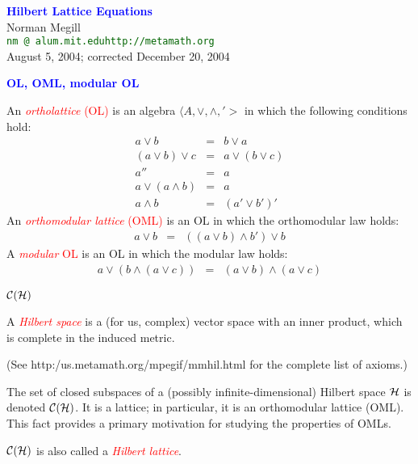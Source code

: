 \documentclass{slides}
\begin{document}
\raggedright
\pagecolor{mint}


\begin{slide}
\begin{center}
\textcolor{blue}{\textbf{\LARGE Hilbert Lattice
Equations}}\\
\vspace{3ex}
{\large Norman Megill}\\
\vspace{1ex}
\textcolor{darkgreen}{\texttt{nm {}@ alum.mit.edu\qquad http://metamath.org}}\\
\vspace{1ex}
August 5, 2004; corrected December 20, 2004
\end{center}
\end{slide}

\begin{slide}

\begin{center}
\textcolor{blue}{\textbf{OL, OML, modular OL}}
\end{center}

An \textcolor{red}{\textit{ortholattice} (OL)} is an algebra
$\langle A,\vee,\wedge,'>$ in which the following conditions hold:
\begin{eqnarray}
a\vee b & = & b\vee a\\
(a\vee b)\vee c & = & a\vee (b\vee c)\\
a'' & = & a\\
a\vee (a\wedge b) & = & a\\
a\wedge b & = & (a'\vee b')'
\end{eqnarray}
An \textcolor{red}{\textit{orthomodular lattice} (OML)} is an OL in which
the orthomodular law holds:
\begin{eqnarray}
a\vee b & = & ((a\vee b)\wedge b')\vee b
\end{eqnarray}
A \textcolor{red}{\textit{modular} OL} is an OL in which the modular law holds:
\begin{eqnarray}
 a\vee (b\wedge (a\vee c))  & = &  (a\vee b)\wedge (a\vee c)
\end{eqnarray}


\end{slide}
\begin{slide}

\begin{center}
\textcolor{blue}{\textbf{${\cal C}({\cal H})$}}
\end{center}

A \textcolor{red}{\textit{Hilbert space}} is a (for us, complex) vector space
with an inner product, which is complete in the induced metric.

(See http:/us.metamath.org/mpegif/mmhil.html for the complete list of
axioms.)

The set of closed subspaces of a (possibly infinite-dimensional) Hilbert
space ${\cal H}$ is denoted \textcolor{red}{${\cal C}({\cal H})$}.  It
is a lattice; in particular, it is an orthomodular lattice (OML).  This
fact provides a primary motivation for studying the properties of OMLs.

${\cal C}({\cal H})$ is also called a \textcolor{red}{\textit{Hilbert lattice}}.

\end{slide}
\end{document}
